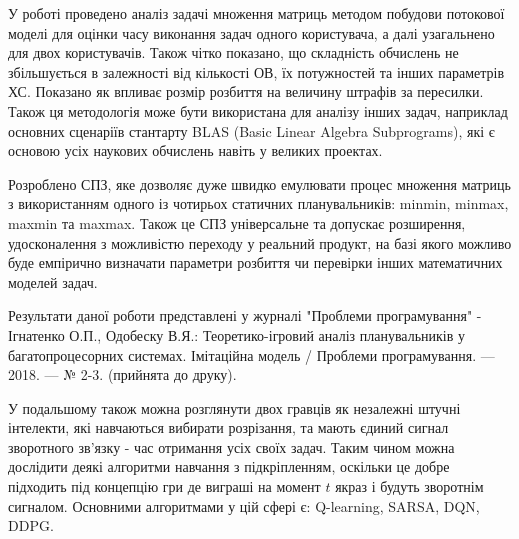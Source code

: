 
У роботі проведено аналіз задачі множення матриць методом побудови потокової моделі для оцінки часу виконання задач одного користувача, а далі узагальнено для двох користувачів. Також чітко показано, що складність обчислень не збільшується в залежності від кількості ОВ, їх потужностей та інших параметрів ХС. Показано як впливає розмір розбиття на величину штрафів за пересилки. Також ця методологія може бути використана для аналізу інших задач, наприклад основних сценаріїв стантарту BLAS (Basic Linear Algebra Subprograms), які є основою усіх наукових обчислень навіть у великих проектах.

Розроблено СПЗ, яке дозволяє дуже швидко емулювати процес множення матриць з використанням одного із чотирьох статичних планувальників: minmin, minmax, maxmin та maxmax. Також це СПЗ універсальне та допускає розширення, удосконалення з можливістю переходу у реальний продукт, на базі якого можливо буде емпірично визначати параметри розбиття чи перевірки інших математичних моделей задач.

Результати даної роботи представлені у журналі "Проблеми програмування" - Ігнатенко О.П., Одобеску В.Я.: Теоретико-ігровий аналіз планувальників у багатопроцесорних системах. Імітаційна модель / Проблеми програмування. — 2018. — № 2-3. (прийнята до друку).

У подальшому також можна розглянути двох гравців як незалежні штучні інтелекти, які навчаються вибирати розрізання, та мають єдиний сигнал зворотного зв'язку - час отримання усіх своїх задач. Таким чином можна дослідити деякі алгоритми навчання з підкріпленням, оскільки це добре підходить під концепцію гри де виграші на момент $t$ якраз і будуть зворотнім сигналом. Основними алгоритмами у цій сфері є: Q-learning, SARSA, DQN, DDPG.
